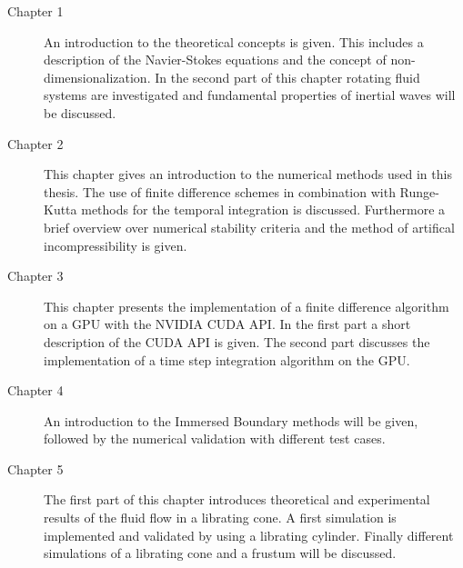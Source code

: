 \begin{description}
\item[Chapter 1] An introduction to the theoretical concepts is given. This includes a description of the Navier-Stokes equations and
                 the concept of non-dimensionalization. In the second part of this chapter rotating fluid systems are investigated and
                 fundamental properties of inertial waves will be discussed.

\item[Chapter 2] This chapter gives an introduction to  the numerical methods used in this thesis.
                 The use of finite difference schemes in combination with Runge-Kutta methods for the temporal integration is discussed.
                 Furthermore a brief overview over numerical stability criteria and the method of artifical incompressibility is given.

\item[Chapter 3] This chapter presents the implementation of a finite difference algorithm on a GPU with the NVIDIA CUDA API.
                 In the first part a short description of the CUDA API is given. The second part discusses the implementation of
                 a time step integration algorithm on the GPU.

\item[Chapter 4] An introduction to  the Immersed Boundary methods will be given,
                    followed by the numerical validation with different test cases.

\item[Chapter 5] The first part of this chapter introduces theoretical and experimental results of the fluid flow in a librating cone.
                 A first simulation is implemented and validated by using a librating cylinder.
                 Finally different  simulations of a librating cone and a frustum will be discussed.

\end{description}

%












